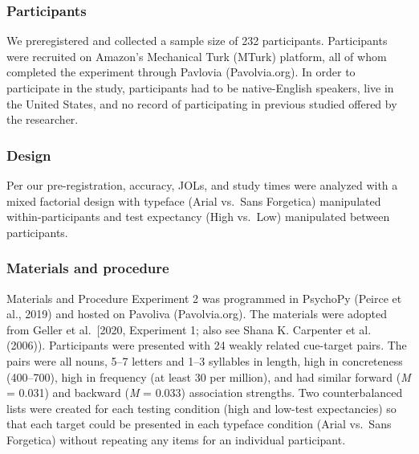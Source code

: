 \documentclass[
  english,
  jou]{apa7}
\begin{document}
\hypertarget{participants-1}{%
\subsubsection{Participants}\label{participants-1}}

We preregistered and collected a sample size of 232 participants. Participants were recruited on Amazon's Mechanical Turk (MTurk) platform, all of whom completed the experiment through Pavlovia (Pavolvia.org). In order to participate in the study, participants had to be native-English speakers, live in the United States, and no record of participating in previous studied offered by the researcher.

\hypertarget{design-1}{%
\subsubsection{Design}\label{design-1}}

Per our pre-registration, accuracy, JOLs, and study times were analyzed with a mixed factorial design with typeface (Arial vs.~Sans Forgetica) manipulated within-participants and test expectancy (High vs.~Low) manipulated between participants.

\hypertarget{materials-and-procedure}{%
\subsubsection{Materials and procedure}\label{materials-and-procedure}}

Materials and Procedure
Experiment 2 was programmed in PsychoPy (Peirce et al., 2019) and hosted on Pavoliva (Pavolvia.org). The materials were adopted from Geller et al.~{[}2020, Experiment 1; also see Shana K. Carpenter et al. (2006)). Participants were presented with 24 weakly related cue-target pairs. The pairs were all nouns, 5--7 letters and 1--3 syllables in length, high in concreteness (400--700), high in frequency (at least 30 per million), and had similar forward (\emph{M} = 0.031) and backward (\emph{M} = 0.033) association strengths. Two counterbalanced lists were created for each testing condition (high and low-test expectancies) so that each target could be presented in each typeface condition (Arial vs.~Sans Forgetica) without repeating any items for an individual participant.
\end{document}
